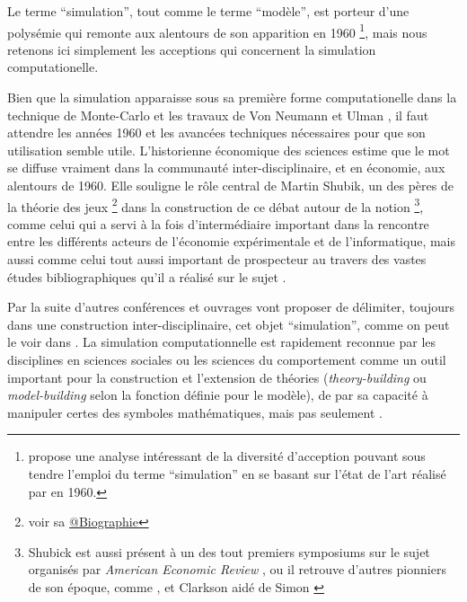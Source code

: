 Le terme \enquote{simulation}, tout comme le terme \enquote{modèle}, est porteur d'une polysémie qui remonte aux alentours de son apparition en 1960 \footnote{ \textcite[343-350]{Morgan2004} propose une analyse intéressant de la diversité d’acception pouvant sous tendre l'emploi du terme \enquote{simulation} en se basant sur l'état de l'art réalisé par \textcite{Shubik1960a} en 1960.}, mais nous retenons ici simplement les acceptions qui concernent la simulation computationelle. 

Bien que la simulation apparaisse sous sa première forme computationelle dans la technique de Monte-Carlo et les travaux de Von Neumann et Ulman \autocite{Eckhardt1987}, il faut attendre les années 1960 et les avancées techniques nécessaires pour que son utilisation semble utile. L'historienne économique des sciences \textcite{Morgan2004} estime que le mot se diffuse vraiment dans la communauté inter-disciplinaire, et en économie, aux alentours de 1960. Elle souligne le rôle central de Martin Shubik, un des pères de la théorie des jeux \footnote{voir sa \href{http://blogs.library.duke.edu/rubenstein/2012/12/18/the-martin-shubik-papers-from-early-game-theory-to-the-strategic-analysis-of-war/}{@Biographie}} dans la construction de ce débat autour de la notion \footnote{Shubick est aussi présent à un des tout premiers symposiums sur le sujet organisés par \textit{American Economic Review} \autocite{Shubik1960b}, ou il retrouve d'autres pionniers de son époque, comme \textcite{Orcutt1960}, et Clarkson aidé de Simon \autocite{Clarkson1960}}, comme celui qui a servi à la fois d'intermédiaire important dans la rencontre entre les différents acteurs de l'économie expérimentale et de l'informatique, mais aussi comme celui tout aussi important de prospecteur au travers des vastes études bibliographiques qu'il a réalisé sur le sujet \autocite{Shubik1960a, Shubik1972} \autocite{Morgan2004}.

Par la suite d'autres conférences et ouvrages vont proposer de délimiter, toujours dans une construction inter-disciplinaire, cet objet \enquote{simulation}, comme on peut le voir dans \autocite{Guetzkow1962, Borko1962, Guetzkow1972, Dutton1971}. La simulation computationnelle est rapidement reconnue par les disciplines en sciences sociales ou les sciences du comportement comme un outil important pour la construction et l'extension de théories (\textit{theory-building} ou \textit{model-building} selon la fonction définie pour le modèle), de par sa capacité à manipuler certes des symboles mathématiques, mais pas seulement \autocite[924-325]{Clarkson1960}.

